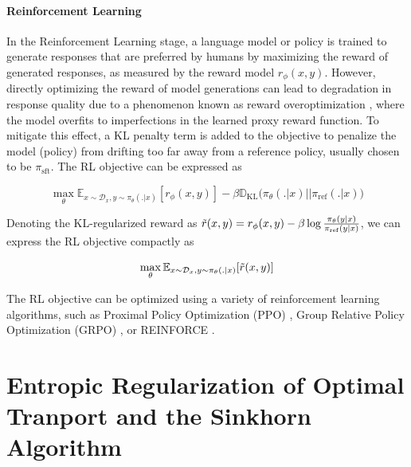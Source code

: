 \paragraph{Reinforcement Learning} In the Reinforcement Learning stage, a language model or policy is trained to generate responses that are preferred by humans by maximizing the reward of generated responses, as measured by the reward model $r_{\phi}(x,y)$. However, directly optimizing the reward of model generations can lead to degradation in response quality \citep{stiennon2022learningsummarizehumanfeedback,Ouyang2022TrainingLM, Jaques2019WayOB} due to a phenomenon known as reward overoptimization \citep{Gao2022ScalingLF,Rafailov2024ScalingLF}, where the model overfits to imperfections in the learned proxy reward function. To mitigate this effect, a KL penalty term is added to the objective to penalize the model (policy) from drifting too far away from a reference policy, usually chosen to be $\pi_{\mathrm{sft}}$. The RL objective can be expressed as

\begin{equation}
  \max_{\theta} \mathbb{E}_{x \sim \mathcal{D}_x, y \sim \pi_{\theta}(.\vert x)} [r_{\phi}(x,y)] - \beta \mathbb{D}_\mathrm{KL}\big(\pi_{\theta}(.\vert x) \vert\vert \pi_\mathrm{ref}(. \vert x)\big)
\end{equation}

Denoting the KL-regularized reward as $\Tilde{r}(x,y) = r_{\phi}(x,y)-\beta \log \frac{\pi_{\theta}(y \vert x)}{\pi_\mathrm{ref}(y \vert x)}$, we can express the RL objective compactly as

\begin{equation}
  \max_{\theta} \mathbb{E}_{x \sim \mathcal{D}_x, y \sim \pi_{\theta}(.\vert x)}[\Tilde{r}(x,y)]
\end{equation}

The RL objective can be optimized using a variety of reinforcement learning algorithms, such as Proximal Policy Optimization (PPO) \citep{schulman2017proximalpolicyoptimizationalgorithms}, Group Relative Policy Optimization (GRPO) \citep{shao2024deepseekmathpushinglimitsmathematical}, or REINFORCE \citep{williams1992simple,ahmadian2024basicsrevisitingreinforcestyle}.

\section{Entropic Regularization of Optimal Tranport and the Sinkhorn Algorithm}
\label{supp:ot}

